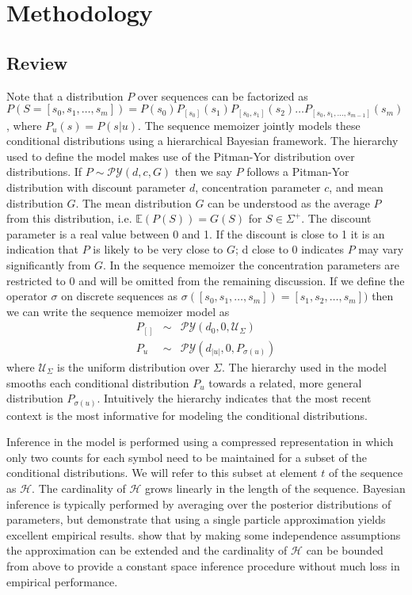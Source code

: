 \section{Methodology}
\label{section:methodology}
\newcommand{\PY}{\ensuremath{\mathcal{P}\mathcal{Y}}}

\subsection{Review}

Note that a distribution $P$ over sequences can be factorized as $P(S = [s_0, s_1, \ldots, s_m]) = P(s_0)P_{[s_0]}(s_1)P_{[s_0,s_1]}(s_2) \ldots P_{[s_0,s_1,\ldots,s_{m-1}]}(s_m)$, where $P_u(s) = P(s | u)$.  The sequence memoizer jointly models these conditional distributions using a hierarchical Bayesian framework.  The hierarchy used to define the model makes use of the Pitman-Yor \citep{Pitman1997} distribution over distributions. If $P \sim \PY(d,c,G)$ then we say $P$ follows a Pitman-Yor distribution with discount parameter $d$, concentration parameter $c$, and mean distribution $G$.  The mean distribution $G$ can be understood as the average $P$ from this distribution, i.e. $\mathbb{E}(P(S)) = G(S)$ for $S \in \Sigma^{+}$.  The discount parameter is a real value between 0 and 1.  If the discount is close to 1 it is an indication that $P$ is likely to be very close to $G$; d close to 0 indicates $P$ may vary significantly from $G$.  In the sequence memoizer the concentration parameters are restricted to 0 and will be omitted from the remaining discussion. If we define the operator $\sigma$ on discrete sequences as $\sigma([s_0, s_1, \ldots, s_m]) = [s_1,s_2, \ldots, s_m])$ then we can write the sequence memoizer model as 
%
\begin{eqnarray*}
	P_{[ ]} &\sim& \PY(d_0,0,\mathcal{U}_{\Sigma})\\
	P_{u} &\sim& \PY(d_{|u|}, 0, P_{\sigma(u)})
\end{eqnarray*}
\noindent where $\mathcal{U}_{\Sigma}$ is the uniform distribution over $\Sigma$.  The hierarchy used in the model smooths each conditional distribution $P_u$ towards a related, more general distribution $P_{\sigma(u)}$.  Intuitively the hierarchy indicates that the most recent context is the most informative for modeling the conditional distributions.

Inference in the model is performed using a compressed representation in which only two counts for each symbol need to be maintained for a subset of the conditional distributions.  We will refer to this subset at element $t$ of the sequence as $\mathcal{H}$.  The cardinality of $\mathcal{H}$ grows linearly in the length of the sequence.  Bayesian inference is typically performed by averaging over the posterior distributions of parameters, but \cite{Gasthaus2010} demonstrate that using a single particle approximation yields excellent empirical results. \cite{Bartlett2010}  show that by making some independence assumptions the approximation can be extended and the cardinality of $\mathcal{H}$ can be bounded from above to provide a constant space inference procedure without much loss in  empirical performance.

